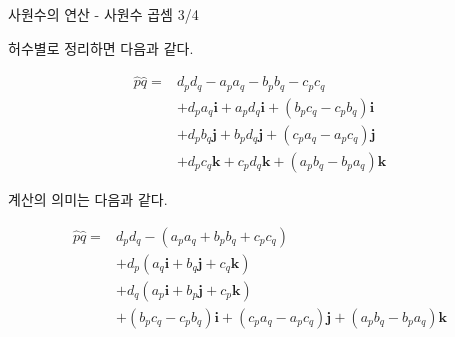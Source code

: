 \begin{frame}[fragile]{사원수의 연산 - 사원수 곱셈 3/4}

허수별로 정리하면 다음과 같다.

\begin{eqnarray}\nonumber
\hat{p}\hat{q} = & d_p d_q  - a_p a_q - b_p b_q - c_p c_q  \\ \nonumber
&+ d_p a_q{\mathbf i} + a_p d_q{\mathbf i} + (b_p c_q - c_p b_q ) {\mathbf i}  \\ \nonumber
&+ d_p b_q{\mathbf j} + b_p d_q {\mathbf j} + (c_p a_q - a_p c_q) {\mathbf j} \\ \nonumber
&+ d_p c_q{\mathbf k} + c_p d_q {\mathbf k} + (a_p b_q - b_p a_q) {\mathbf k} \nonumber
\end{eqnarray}


계산의 의미는 다음과 같다.

\begin{eqnarray} \nonumber
\hat{p}\hat{q} = & d_p d_q  - (a_p a_q + b_p b_q + c_p c_q)  \\ \nonumber
&+ d_p ( a_q{\mathbf i} + b_q {\mathbf j} + c_q {\mathbf k}) \\ \nonumber
&+ d_q ( a_p{\mathbf i} + b_p {\mathbf j} + c_p {\mathbf k}) \\ \nonumber
&+ (b_p c_q - c_p b_q ) {\mathbf i}  + (c_p a_q - a_p c_q) {\mathbf j} + (a_p b_q - b_p a_q) {\mathbf k} \nonumber
\end{eqnarray}


\end{frame}

